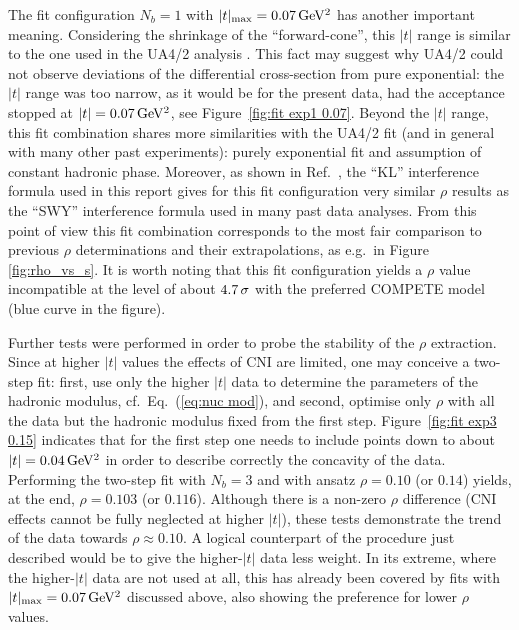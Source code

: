 The fit configuration $N_b=1$ with $|t|_{\rm max} = 0.07\,{\rm GeV^2}$ has another important meaning. Considering the shrinkage of the ``forward-cone'', this $|t|$ range is similar to the one used in the UA4/2 analysis \cite{ua4-rho}. This fact may suggest why UA4/2 could not observe deviations of the differential cross-section from pure exponential: the $|t|$ range was too narrow, as it would be for the present data, had the acceptance stopped at $|t| = 0.07\,{\rm GeV^2}$, see Figure~\ref{fig:fit exp1 0.07}. Beyond the $|t|$ range, this fit combination shares more similarities with the UA4/2 fit (and in general with many other past experiments): purely exponential fit and assumption of constant hadronic phase. Moreover, as shown in Ref.~\cite{totem-8tev-1km}, the ``KL'' interference formula \cite{kl94} used in this report gives for this fit configuration very similar $\rho$ results as the ``SWY'' interference formula \cite{wy68} used in many past data analyses. From this point of view this fit combination corresponds to the most fair comparison to previous $\rho$ determinations and their extrapolations, as e.g.~in Figure \ref{fig:rho_vs_s}. It is worth noting that this fit configuration yields a $\rho$ value incompatible at the level of about $4.7\,{\rm \sigma}$
with the preferred COMPETE model (blue curve in the figure).

Further tests were performed in order to probe the stability of the $\rho$ extraction. Since at higher $|t|$ values the effects of CNI are limited, one may conceive a two-step fit: first, use only the higher $|t|$ data to determine the parameters of the hadronic modulus, cf.~Eq.~(\ref{eq:nuc mod}), and second, optimise only $\rho$ with all the data but the hadronic modulus fixed from the first step. Figure~\ref{fig:fit exp3 0.15} indicates that for the first step one needs to include points down to about $|t| = 0.04\,{\rm GeV^2}$ in order to describe correctly the concavity of the data. Performing the two-step fit with $N_b=3$ and with ansatz $\rho = 0.10$ (or $0.14$) yields, at the end, $\rho = 0.103$ (or $0.116$). Although there is a non-zero $\rho$ difference (CNI effects cannot be fully neglected at higher $|t|$), these tests demonstrate the trend of the data towards $\rho \approx 0.10$. A logical counterpart of the procedure just described would be to give the higher-$|t|$ data less weight. In its extreme, where the higher-$|t|$ data are not used at all, this has already been covered by fits with $|t|_{\rm max} = 0.07\,{\rm GeV^2}$ discussed above, also showing the preference for lower $\rho$ values.

